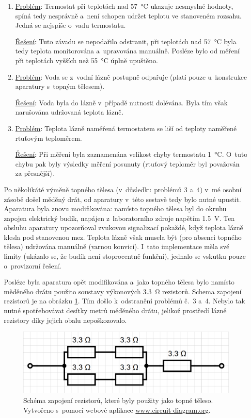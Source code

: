 \documentclass[12pt]{article}
\begin{document}
\begin{enumerate}[noitemsep, topsep = 0pt]
    \item \underline{Problém}: Termostat při teplotách nad \SI{57}{\degreeCelsius} ukazuje nesmyslné hodnoty, spíná tedy nesprávně a~není schopen udržet teplotu ve stanoveném rozsahu. Jedná se nejspíše o~vadu termostatu.
    \par \underline{Řešení}: Tuto závadu se nepodařilo odstranit, při teplotách nad \SI{57}{\degreeCelsius} byla tedy teplota monitorována a~upravována manuálně. Posléze bylo od měření při teplotách vyšších než \SI{55}{\degreeCelsius} úplně upuštěno.
    \item \underline{Problém}: Voda se z~vodní lázně postupně odpařuje (platí pouze u~konstrukce aparatury s~topným tělesem).
    \par \underline{Řešení}: Voda byla do lázně v~případě nutnosti dolévána. Byla tím však narušována udržovaná teplota lázně.
    \item \underline{Problém}: Teplota lázně naměřená termostatem se liší od teploty naměřené rtuťovým teploměrem.
    \par \underline{Řešení}: Při měření byla zaznamenána velikost chyby termostatu \SI{1}{\degreeCelsius}. O~tuto chybu pak byly výsledky měření posunuty (rtuťový teploměr byl považován za přesnější).
\end{enumerate}
Po několikáté výměně topného tělesa (v~důsledku problémů 3 a~4) v~mé osobní zásobě došel měděný drát, od aparatury v~této sestavě tedy bylo nutné upustit. Aparatura byla znovu modifikována: namísto topného tělesa byl do okruhu zapojen elektrický budík, napájen z~laboratorního zdroje napětím \SI{1,5}{\volt}. Ten obsluhu aparatury upozorňoval zvukovou signalizací pokaždé, když teplota lázně klesla pod stanovenou mez. Teplota lázně však musela být (pro absenci topného tělesa) udržována manuálně (varnou konvicí). I~tato implementace měla své limity (ukázalo se, že budík není stoprocentně funkční), jednalo se vskutku pouze o~provizorní řešení.
\par
Posléze byla aparatura opět modifikována a~jako topného tělesa bylo namísto měděného drátu použito soustavy výkonových \SI{3,3}{\ohm} rezistorů. Schema zapojení rezistorů je na obrázku \ref{fig:schema_zapojeni_rezistory}. Tím došlo k~odstranění problémů č.~3 a~4. Nebylo tak nutné spotřebovávat desítky metrů měděného drátu, jelikož prostředí lázně rezistory díky jejich obalu nepoškozovalo. 

\begin{figure}
    \centering
    \includegraphics[width = 0.75\linewidth]{figures/rezistory.png}
    \caption{Schéma zapojení rezistorů, které byly použity jako topné těleso. Vytvořeno s~pomocí webové aplikace \url{www.circuit-diagram.org}.}
    \label{fig:schema_zapojeni_rezistory}
\end{figure}
\end{document}
